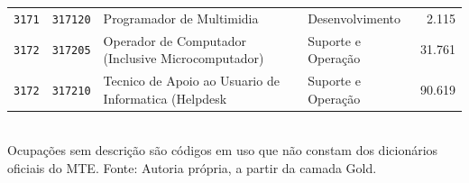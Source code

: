 \begin{quadro}[htbp]
\begin{tabular}{llp{6.0cm}lr}
        \texttt{3171} & \texttt{317120} & Programador de Multimidia & Desenvolvimento & 2.115 \\
        \texttt{3172} & \texttt{317205} & Operador de Computador (Inclusive Microcomputador) & Suporte e Operação & 31.761 \\
        \texttt{3172} & \texttt{317210} & Tecnico de Apoio ao Usuario de Informatica (Helpdesk & Suporte e Operação & 90.619 \\
        \bottomrule
    \end{tabular}
    \\[4pt]
    Ocupações sem descrição são códigos em uso que não constam dos dicionários oficiais do MTE. Fonte: Autoria própria, a partir da camada Gold.
\end{quadro}
